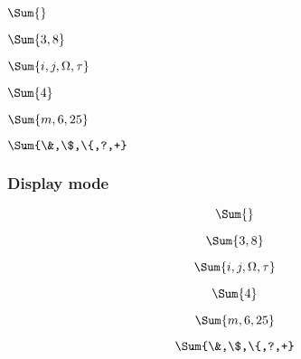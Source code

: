 \documentclass[10pt]{extarticle}
\newcommand{\<}{\langle}
\renewcommand{\>}{\rangle}
\theoremstyle{mystyle}{\newtheorem*{remark}{Remark}}
\theoremstyle{mystyle}{\newtheorem*{remarks}{Remarks}}
\theoremstyle{mystyle}{\newtheorem*{example}{Example}}
\theoremstyle{mystyle}{\newtheorem*{examples}{Examples}}
\theoremstyle{definition}{\newtheorem*{exercise}{Exercise}}
\theoremstyle{warn}
\begin{document}
\begin{multicols}{2} %
\begin{verbbox}
$\Sum{}$
\end{verbbox}

\begin{verbbox}
$\Sum{3,8}$
\end{verbbox}

\begin{verbbox}
$\Sum{i,j,\Omega,\tau}$
\end{verbbox}
\begin{verbbox}
$\Sum{4}$
\end{verbbox}

\begin{verbbox}
$\Sum{m,6,25}$
\end{verbbox}

\begin{verbbox}
$\Sum{\&,\$,\{,?,+}$
\end{verbbox}
\end{multicols}

\subsubsection*{Display mode}

\begin{multicols}{2} %
\begin{verbbox}
$$\Sum{}$$
\end{verbbox}

\begin{verbbox}
$$\Sum{3,8}$$
\end{verbbox}

\begin{verbbox}
$$\Sum{i,j,\Omega,\tau}$$
\end{verbbox}
\begin{verbbox}
$$\Sum{4}$$
\end{verbbox}

\begin{verbbox}
$$\Sum{m,6,25}$$
\end{verbbox}

\begin{verbbox}
$$\Sum{\&,\$,\{,?,+}$$
\end{verbbox}
\end{multicols}
\end{document}
